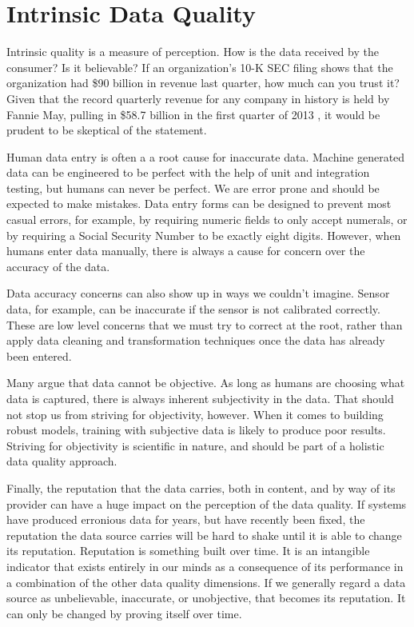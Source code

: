 \chapter{Intrinsic Data Quality}

Intrinsic quality is a measure of perception. How is the data received by the consumer? Is it believable?
If an organization's 10-K SEC filing shows that the organization had \$90 billion in revenue last quarter, 
how much can you trust it? Given that the record quarterly revenue for any company in history is held by
Fannie May, pulling in \$58.7 billion in the first quarter of 2013 \cite{fanniemae}, it would be prudent to be skeptical
of the statement.

Human data entry is often a a root cause for inaccurate data. Machine generated data can be engineered to be perfect with 
the help of unit and integration testing, but humans can never be perfect. We are error prone and should be expected to 
make mistakes. Data entry forms can be designed to prevent most casual errors, for example, by requiring numeric fields
to only accept numerals, or by requiring a Social Security Number to be exactly eight digits. However, when humans enter
data manually, there is always a cause for concern over the accuracy of the data. 

Data accuracy concerns can also show up in ways we couldn't imagine. Sensor data, for example, can be inaccurate if
the sensor is not calibrated correctly. These are low level concerns that we must try to correct at the root, rather
than apply data cleaning and transformation techniques once the data has already been entered.

Many argue that data cannot be objective. As long as humans are choosing what data is captured, there is always 
inherent subjectivity in the data. That should not stop us from striving for objectivity, however. When it comes to
building robust models, training with subjective data is likely to produce poor results. Striving for objectivity
is scientific in nature, and should be part of a holistic data quality approach.

Finally, the reputation that the data carries, both in content, and by way of its provider can have a huge impact
on the perception of the data quality. If systems have produced erronious data for years, but have recently been fixed,
the reputation the data source carries will be hard to shake until it is able to change its reputation. Reputation is
something built over time. It is an intangible indicator that exists entirely in our minds as a consequence of 
its performance in a combination of the other data quality dimensions. If we generally regard a data source as
unbelievable, inaccurate, or unobjective, that becomes its reputation. It can only be changed by proving itself 
over time.

